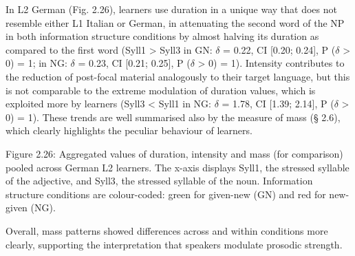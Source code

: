 \begin{styleStandard}
In L2 German (Fig. 2.26), learners use duration in a unique way that does not resemble either L1 Italian or German, in attenuating the second word of the NP in both information structure conditions by almost halving its duration as compared to the first word (Syll1 {\textgreater} Syll3 in GN: $\delta $ = 0.22, CI [0.20; 0.24], P ($\delta $ {\textgreater} 0) = 1; in NG: $\delta $ = 0.23, CI [0.21; 0.25], P ($\delta $ {\textgreater} 0) = 1). Intensity contributes to the reduction of post-focal material analogously to their target language, but this is not comparable to the extreme modulation of duration values, which is exploited more by learners (Syll3 {\textless} Syll1 in NG: $\delta $ = 1.78, CI [1.39; 2.14], P ($\delta $ {\textgreater} 0) = 1). These trends are well summarised also by the measure of mass (§ 2.6), which clearly highlights the peculiar behaviour of learners.
\end{styleStandard}

\begin{styleStandard}
  [Warning: Image ignored] %
 
\end{styleStandard}

\begin{stylecaption}
Figure 2.26: Aggregated values of duration, intensity and mass (for comparison) pooled across German L2 learners. The x-axis displays Syll1, the stressed syllable of the adjective, and Syll3, the stressed syllable of the noun. Information structure conditions are colour-coded: green for given-new (GN) and red for new-given (NG).
\end{stylecaption}

\begin{styleStandard}
Overall, mass patterns showed differences across and within conditions more clearly, supporting the interpretation that speakers modulate prosodic strength.
\end{styleStandard}

